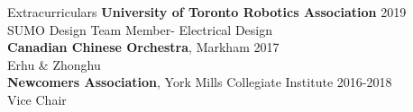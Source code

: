 \documentclass{my_resume} %
\begin{document}
\begin{minipage}[t]{0.66\textwidth}
    \begin{rSection}{Extracurriculars}
        \textbf{University of Toronto Robotics Association} \hfill{2019}    \\        
        SUMO Design Team Member- Electrical Design\\
        \textbf{Canadian Chinese Orchestra}, Markham  \hfill{2017}\\ 
        Erhu \& Zhonghu \\
        \textbf{Newcomers Association}, York Mills Collegiate Institute \hfill{2016-2018}\\
        Vice Chair
    \end{rSection}


\end{minipage}
\end{document}
